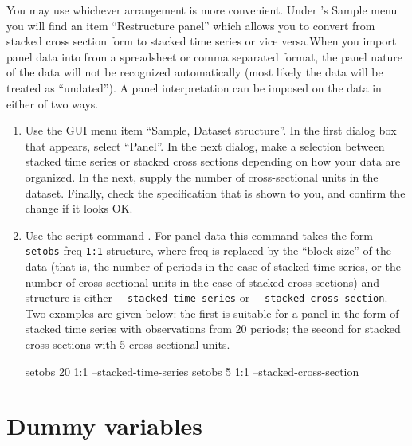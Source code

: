 You may use whichever arrangement is more convenient. Under
's \textsf{Sample} menu you will find an item ``Restructure
panel'' which allows you to convert from stacked cross section form to
stacked time series or vice versa.When you import panel data into
 from a spreadsheet or comma separated format, the panel
nature of the data will not be recognized automatically (most likely
the data will be treated as ``undated'').  A panel interpretation can
be imposed on the data in either of two ways.
\begin{enumerate}
\item Use the GUI menu item ``Sample, Dataset structure''.  In the
  first dialog box that appears, select ``Panel''.  In the next
  dialog, make a selection between stacked time series or stacked
  cross sections depending on how your data are organized.  In the
  next, supply the number of cross-sectional units in the dataset.
  Finally, check the specification that is shown to you, and confirm
  the change if it looks OK.
	
\item Use the script command .  For panel data this
  command takes the form \verb+setobs+ freq \verb+1:1+ structure,
  where freq is replaced by the ``block size'' of the data (that is,
  the number of periods in the case of stacked time series, or the
  number of cross-sectional units in the case of stacked
  cross-sections) and structure is either \verb+--stacked-time-series+
  or \verb+--stacked-cross-section+.  Two examples are given below:
  the first is suitable for a panel in the form of stacked time series
  with observations from 20 periods; the second for stacked cross
  sections with 5 cross-sectional units.
	
\begin{code}
	    setobs 20 1:1 --stacked-time-series
	    setobs 5 1:1 --stacked-cross-section
\end{code}

\end{enumerate}



\section{Dummy variables}
\label{dummies}

